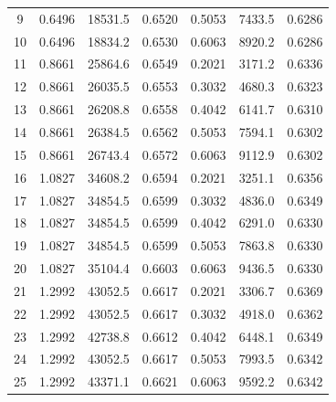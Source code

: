 {\begin{longtable}{|c|c|c|c|c|c|c|}
    9            & 0.6496         & 18531.5         & 0.6520               & 0.5053         & 7433.5          & 0.6286               \\
    10           & 0.6496         & 18834.2         & 0.6530               & 0.6063         & 8920.2          & 0.6286               \\ \hline
    11           & 0.8661         & 25864.6         & 0.6549               & 0.2021         & 3171.2          & 0.6336               \\
    12           & 0.8661         & 26035.5         & 0.6553               & 0.3032         & 4680.3          & 0.6323               \\
    13           & 0.8661         & 26208.8         & 0.6558               & 0.4042         & 6141.7          & 0.6310               \\
    14           & 0.8661         & 26384.5         & 0.6562               & 0.5053         & 7594.1          & 0.6302               \\
    15           & 0.8661         & 26743.4         & 0.6572               & 0.6063         & 9112.9          & 0.6302               \\ \hline
    16           & 1.0827         & 34608.2         & 0.6594               & 0.2021         & 3251.1          & 0.6356               \\
    17           & 1.0827         & 34854.5         & 0.6599               & 0.3032         & 4836.0          & 0.6349               \\
    18           & 1.0827         & 34854.5         & 0.6599               & 0.4042         & 6291.0          & 0.6330               \\
    19           & 1.0827         & 34854.5         & 0.6599               & 0.5053         & 7863.8          & 0.6330               \\
    20           & 1.0827         & 35104.4         & 0.6603               & 0.6063         & 9436.5          & 0.6330               \\ \hline
    21           & 1.2992         & 43052.5         & 0.6617               & 0.2021         & 3306.7          & 0.6369               \\
    22           & 1.2992         & 43052.5         & 0.6617               & 0.3032         & 4918.0          & 0.6362               \\
    23           & 1.2992         & 42738.8         & 0.6612               & 0.4042         & 6448.1          & 0.6349               \\
    24           & 1.2992         & 43052.5         & 0.6617               & 0.5053         & 7993.5          & 0.6342               \\
    25           & 1.2992         & 43371.1         & 0.6621               & 0.6063         & 9592.2          & 0.6342               \\ \hline
\end{longtable}
}

